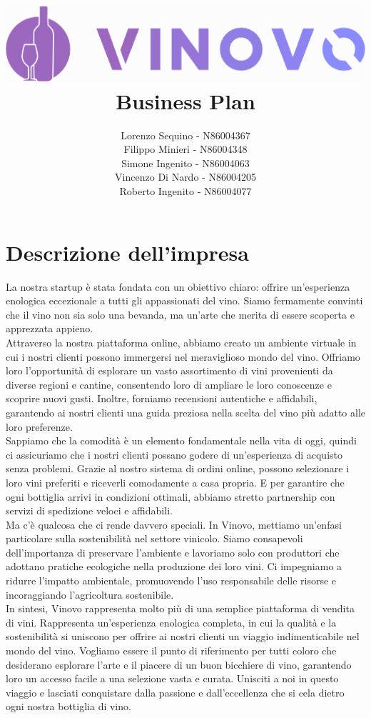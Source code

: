 \documentclass[12pt, a4paper]{article}
\title{
    \includegraphics[width=.8\textwidth]{images/LOGO.png}\\
    \textbf{Business Plan}
}
\date{}
\author{
    Lorenzo Sequino - N86004367 \\
    Filippo Minieri - N86004348 \\
    Simone Ingenito - N86004063 \\
    Vincenzo Di Nardo - N86004205 \\
    Roberto Ingenito - N86004077
}
\newcommand{\meskip}{\medskip \\}
\begin{document}
\maketitle

\newpage

\tableofcontents

\newpage

\section{Descrizione dell'impresa}
La nostra startup è stata fondata con un obiettivo chiaro: offrire un'esperienza enologica eccezionale a tutti gli appassionati del vino.
Siamo fermamente convinti che il vino non sia solo una bevanda, ma un'arte che merita di essere scoperta e apprezzata appieno.\meskip
Attraverso la nostra piattaforma online, abbiamo creato un ambiente virtuale in cui i nostri clienti possono immergersi nel meraviglioso mondo del vino. Offriamo loro l'opportunità di esplorare un vasto assortimento di vini provenienti da diverse regioni e cantine, consentendo loro di ampliare le loro conoscenze e scoprire nuovi gusti. Inoltre, forniamo recensioni autentiche e affidabili, garantendo ai nostri clienti una guida preziosa nella scelta del vino più adatto alle loro preferenze.\meskip
Sappiamo che la comodità è un elemento fondamentale nella vita di oggi, quindi ci assicuriamo che i nostri clienti possano godere di un'esperienza di acquisto senza problemi. Grazie al nostro sistema di ordini online, possono selezionare i loro vini preferiti e riceverli comodamente a casa propria. E per garantire che ogni bottiglia arrivi in condizioni ottimali, abbiamo stretto partnership con servizi di spedizione veloci e affidabili.\meskip
Ma c'è qualcosa che ci rende davvero speciali.
In Vinovo, mettiamo un'enfasi particolare sulla sostenibilità nel settore vinicolo.
Siamo consapevoli dell'importanza di preservare l'ambiente e lavoriamo solo con produttori che adottano pratiche ecologiche nella produzione dei loro vini.
Ci impegniamo a ridurre l'impatto ambientale, promuovendo l'uso responsabile delle risorse e incoraggiando l'agricoltura sostenibile.\meskip
In sintesi, Vinovo rappresenta molto più di una semplice piattaforma di vendita di vini. Rappresenta un'esperienza enologica completa, in cui la qualità e la sostenibilità si uniscono per offrire ai nostri clienti un viaggio indimenticabile nel mondo del vino. Vogliamo essere il punto di riferimento per tutti coloro che desiderano esplorare l'arte e il piacere di un buon bicchiere di vino, garantendo loro un accesso facile a una selezione vasta e curata.
Unisciti a noi in questo viaggio e lasciati conquistare dalla passione e dall'eccellenza che si cela dietro ogni nostra bottiglia di vino.
\end{document}
